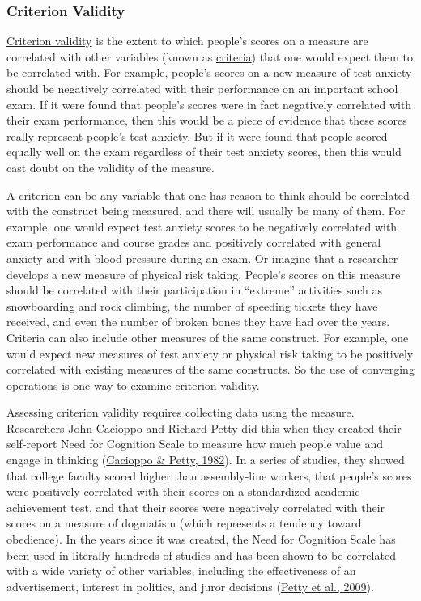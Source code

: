 \documentclass[
]{krantz}
\begin{document}
\hypertarget{criterion-validity}{%
\subsubsection*{Criterion Validity}\label{criterion-validity}}


\protect\hyperlink{criterion-validity-1}{Criterion validity} is the extent to which people's scores on a measure are correlated with other variables (known as \protect\hyperlink{criteria}{criteria}) that one would expect them to be correlated with. For example, people's scores on a new measure of test anxiety should be negatively correlated with their performance on an important school exam. If it were found that people's scores were in fact negatively correlated with their exam performance, then this would be a piece of evidence that these scores really represent people's test anxiety. But if it were found that people scored equally well on the exam regardless of their test anxiety scores, then this would cast doubt on the validity of the measure.

A criterion can be any variable that one has reason to think should be correlated with the construct being measured, and there will usually be many of them. For example, one would expect test anxiety scores to be negatively correlated with exam performance and course grades and positively correlated with general anxiety and with blood pressure during an exam. Or imagine that a researcher develops a new measure of physical risk taking. People's scores on this measure should be correlated with their participation in ``extreme'' activities such as snowboarding and rock climbing, the number of speeding tickets they have received, and even the number of broken bones they have had over the years. Criteria can also include other measures of the same construct. For example, one would expect new measures of test anxiety or physical risk taking to be positively correlated with existing measures of the same constructs. So the use of converging operations is one way to examine criterion validity.

Assessing criterion validity requires collecting data using the measure. Researchers John Cacioppo and Richard Petty did this when they created their self-report Need for Cognition Scale to measure how much people value and engage in thinking (\protect\hyperlink{ref-cacioppo1982need}{Cacioppo \& Petty, 1982}). In a series of studies, they showed that college faculty scored higher than assembly-line workers, that people's scores were positively correlated with their scores on a standardized academic achievement test, and that their scores were negatively correlated with their scores on a measure of dogmatism (which represents a tendency toward obedience). In the years since it was created, the Need for Cognition Scale has been used in literally hundreds of studies and has been shown to be correlated with a wide variety of other variables, including the effectiveness of an advertisement, interest in politics, and juror decisions (\protect\hyperlink{ref-petty2009need}{Petty et al., 2009}).
\end{document}
